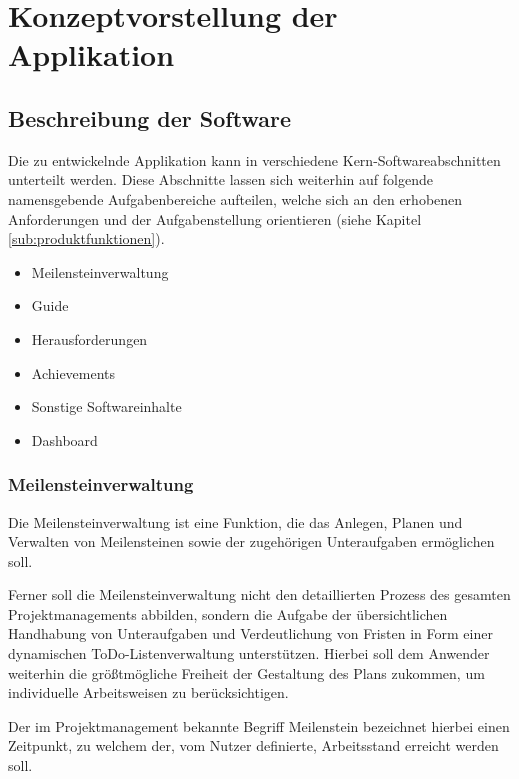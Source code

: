 \documentclass[bibliography=totoc,listof=totoc,BCOR=5mm,DIV=12,oneside]{scrbook}
\begin{document}
\newpage
\chapter{Konzeptvorstellung der Applikation} \label{chap:konzept}

\section{Beschreibung der Software}
\par Die zu entwickelnde Applikation kann in verschiedene Kern-Softwareabschnitten unterteilt werden. Diese Abschnitte lassen sich weiterhin auf folgende namensgebende Aufgabenbereiche aufteilen, welche sich an den erhobenen Anforderungen und der Aufgabenstellung orientieren (siehe Kapitel \ref{sub:produktfunktionen}).

\begin{itemize}
\item Meilensteinverwaltung
\item Guide
\item Herausforderungen
\item Achievements
\item Sonstige Softwareinhalte
\item Dashboard
\end{itemize}

\newpage
\subsection{Meilensteinverwaltung}
\par Die Meilensteinverwaltung ist eine Funktion, die das Anlegen, Planen und Verwalten von Meilensteinen sowie der zugehörigen Unteraufgaben ermöglichen soll. 
\par Ferner soll die Meilensteinverwaltung nicht den detaillierten Prozess des gesamten Projektmanagements abbilden, sondern die Aufgabe der übersichtlichen Handhabung von Unteraufgaben und Verdeutlichung von Fristen in Form einer dynamischen ToDo-Listenverwaltung unterstützen. Hierbei soll dem Anwender weiterhin die größtmögliche Freiheit der Gestaltung des Plans zukommen, um individuelle Arbeitsweisen zu berücksichtigen. 
\par \bigskip Der im Projektmanagement bekannte Begriff \grqq Meilenstein\grqq{} bezeichnet hierbei einen Zeitpunkt, zu welchem der, vom Nutzer definierte, Arbeitsstand erreicht werden soll.
\end{document}
